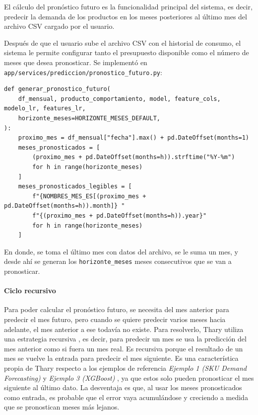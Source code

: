 El cálculo del pronóstico futuro es la funcionalidad principal del sistema, es decir, predecir la demanda de los productos en los meses posteriores al último mes del archivo CSV cargado por el usuario.

Después de que el usuario sube el archivo CSV con el historial de consumo, el sistema le permite configurar tanto el presupuesto disponible como el número de meses que desea pronosticar. Se implementó en \texttt{app/services/prediccion/pronostico\_futuro.py}:

\label{lst:generar_pronostico_futuro}
\begin{verbatim}
def generar_pronostico_futuro(
    df_mensual, producto_comportamiento, model, feature_cols, modelo_lr, features_lr,
    horizonte_meses=HORIZONTE_MESES_DEFAULT,
):
    proximo_mes = df_mensual["fecha"].max() + pd.DateOffset(months=1)
    meses_pronosticados = [
        (proximo_mes + pd.DateOffset(months=h)).strftime("%Y-%m")
        for h in range(horizonte_meses)
    ]
    meses_pronosticados_legibles = [
        f"{NOMBRES_MES_ES[(proximo_mes + pd.DateOffset(months=h)).month]} "
        f"{(proximo_mes + pd.DateOffset(months=h)).year}"
        for h in range(horizonte_meses)
    ]
\end{verbatim}

En donde, se toma el último mes con datos del archivo, se le suma un mes, y desde ahí se generan los \texttt{horizonte\_meses} meses consecutivos que se van a pronosticar.

\paragraph{Ciclo recursivo}

Para poder calcular el pronóstico futuro, se necesita del mes anterior para predecir el mes futuro, pero cuando se quiere predecir varios meses hacia adelante, el mes anterior a ese todavía no existe. Para resolverlo, Thary utiliza una estrategia recursiva \cite{BENTAIEB20127067}, es decir, para predecir un mes se usa la predicción del mes anterior como si fuera un mes real. Es recursiva porque el resultado de un mes se vuelve la entrada para predecir el mes siguiente. Es una característica propia de Thary respecto a los ejemplos de referencia \textit{Ejemplo 1 (SKU Demand Forecasting)} \cite{ejemplo1_demandforecast} y \textit{Ejemplo 3 (XGBoost)} \cite{ejemplo3_ksmooi_inventorydemand}, ya que estos solo pueden pronosticar el mes siguiente al último dato. La desventaja es que, al usar los meses pronosticados como entrada, es probable que el error vaya acumulándose y creciendo a medida que se pronostican meses más lejanos.

